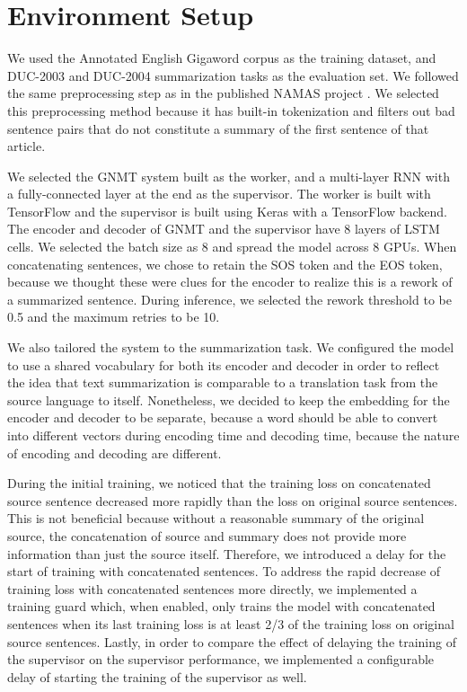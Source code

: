 \documentclass[letterpaper]{article} %
\begin{document}
\section{Environment Setup}
We used the Annotated English Gigaword corpus \cite{napoles2012annotated} as the training dataset, and DUC-2003 and DUC-2004 summarization tasks \cite{over2007duc} as the evaluation set. We followed the same preprocessing step as in the published NAMAS project \cite{rush2015neural}. We selected this preprocessing method because it has built-in tokenization and filters out bad sentence pairs that do not constitute a summary of the first sentence of that article.

We selected the GNMT system built as the worker, and a multi-layer RNN with a fully-connected layer at the end as the supervisor. The worker is built with TensorFlow and the supervisor is built using Keras with a TensorFlow backend. The encoder and decoder of GNMT and the supervisor have 8 layers of LSTM cells. We selected the batch size as 8 and spread the model across 8 GPUs. When concatenating sentences, we chose to retain the SOS token and the EOS token, because we thought these were clues for the encoder to realize this is a rework of a summarized sentence. During inference, we selected the rework threshold to be 0.5 and the maximum retries to be 10.

We also tailored the system to the summarization task. We configured the model to use a shared vocabulary for both its encoder and decoder in order to reflect the idea that text summarization is comparable to a translation task from the source language to itself. Nonetheless, we decided to keep the embedding for the encoder and decoder to be separate, because a word should be able to convert into different vectors during encoding time and decoding time, because the nature of encoding and decoding are different.

During the initial training, we noticed that the training loss on concatenated source sentence decreased more rapidly than the loss on original source sentences. This is not beneficial because without a reasonable summary of the original source, the concatenation of source and summary does not provide more information than just the source itself. Therefore, we introduced a delay for the start of training with concatenated sentences. To address the rapid decrease of training loss with concatenated sentences more directly, we implemented a training guard which, when enabled, only trains the model with concatenated sentences when its last training loss is at least 2/3 of the training loss on original source sentences. Lastly, in order to compare the effect of delaying the training of the supervisor on the supervisor performance, we implemented a configurable delay of starting the training of the supervisor as well.
\end{document}

